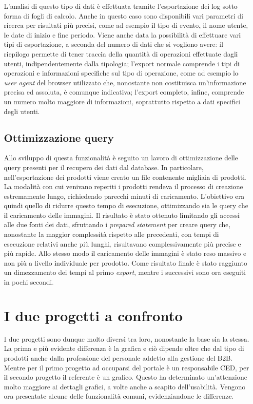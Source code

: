 L'analisi di questo tipo di dati è effettuata tramite l'esportazione dei log sotto forma di fogli di calcolo. Anche in questo caso sono disponibili vari parametri di ricerca per risultati più precisi, come ad esempio il tipo di evento, il nome utente, le date di inizio e fine periodo. Viene anche data la possibilità di effettuare vari tipi di esportazione, a seconda del numero di dati che si vogliono avere: il riepilogo permette di tener traccia della quantità di operazioni effettuate dagli utenti, indipendentemente dalla tipologia; l'export normale comprende i tipi di operazioni e informazioni specifiche sul tipo di operazione, come ad esempio lo \textit{user agent} del browser utilizzato che, nonostante non costituisca un'informazione precisa ed assoluta, è comunque indicativa; l'export completo, infine, comprende un numero molto maggiore di informazioni, soprattutto rispetto a dati specifici degli utenti.

\subsection{Ottimizzazione query}
Allo sviluppo di questa funzionalità è seguito un lavoro di ottimizzazione delle query presenti per il recupero dei dati dal database. In particolare, nell'esportazione dei prodotti viene creato un file contenente migliaia di prodotti. La modalità con cui venivano reperiti i prodotti rendeva il processo di creazione estremamente lungo, richiedendo parecchi minuti di caricamento. L'obiettivo era quindi quello di ridurre questo tempo di esecuzione, ottimizzando sia le query che il caricamento delle immagini. Il risultato è stato ottenuto limitando gli accessi alle due fonti dei dati, sfruttando i \textit{prepared statement} per creare query che, nonostante la maggior complessità rispetto alle precedenti, con tempi di esecuzione relativi anche più lunghi, risultavano complessivamente più precise e più rapide. Allo stesso modo il caricamento delle immagini è stato reso massivo e non più a livello individuale per prodotto. Come risultato finale è stato raggiunto un dimezzamento dei tempi al primo \textit{export}, mentre i successivi sono ora eseguiti in pochi secondi.

\section{I due progetti a confronto}
I due progetti sono dunque molto diversi tra loro, nonostante la base sia la stessa. La prima e più evidente differenza è la grafica e ciò dipende oltre che dal tipo di prodotti anche dalla professione del personale addetto alla gestione del B2B. Mentre per il primo progetto ad occuparsi del portale è un responsabile \Gls{CED}, per il secondo progetto il referente è un grafico. Questo ha determinato un'attenzione molto maggiore ai dettagli grafici, a volte anche a scapito dell'usabilità. Vengono ora presentate alcune delle funzionalità comuni, evidenziandone le differenze.

